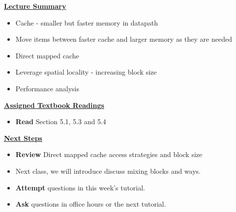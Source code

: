 



\begin{frame}[fragile]
 \underline{\textbf{Lecture Summary}}
 \begin{itemize}
 \item Cache - smaller but faster memory in datapath
 \item Move items between faster cache and larger memory as they are needed
\item Direct mapped cache
\item Leverage spatial locality - increasing block size 
\item Performance analysis
\end{itemize}

 \underline{\textbf{Assigned Textbook Readings}}
\begin{itemize}
     \item \textbf{Read} Section 5.1, 5.3 and 5.4
     \end{itemize}
    \underline{\textbf{Next Steps}}
    \begin{itemize}
     \item \textbf{Review} Direct mapped cache access strategies and block size 
\item Next class, we will introduce discuss mixing blocks and ways.
\item \textbf{Attempt} questions in this week's tutorial. 
    \item \textbf{Ask} questions in office hours or the next tutorial.
 \end{itemize}

\end{frame}
